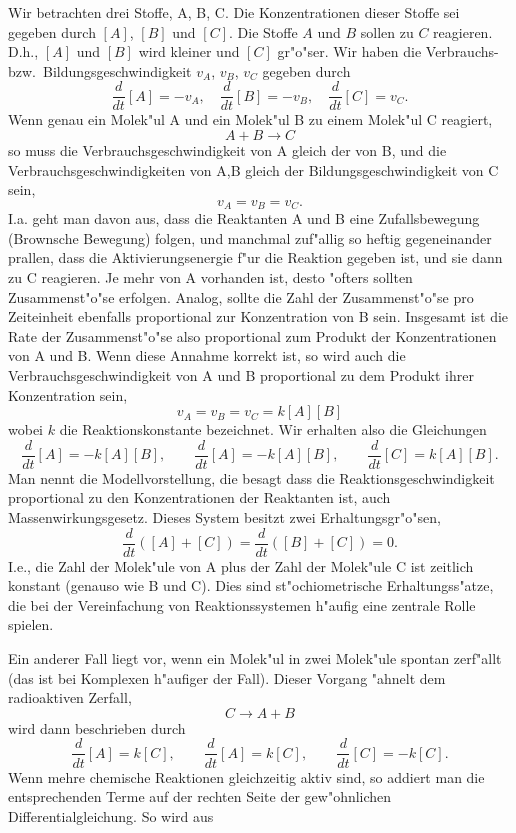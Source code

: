 Wir betrachten drei Stoffe, A, B, C. Die Konzentrationen dieser Stoffe sei gegeben durch $[A]$,
$[B]$ und $[C]$. Die Stoffe $A$ und $B$ sollen zu $C$ reagieren. D.h., $[A]$ und $[B]$ wird kleiner
und $[C]$ gr"o"ser. Wir haben die Verbrauchs- bzw.\ Bildungsgeschwindigkeit $v_A$, $v_B$, $v_C$ gegeben durch
$$ 
\frac d{dt}[A] = -v_A,\quad 
\frac d{dt}[B] = -v_B,\quad 
\frac d{dt}[C] = v_C.$$
Wenn genau ein Molek"ul A und ein Molek"ul B zu einem Molek"ul C reagiert, 
$$ A+B\rightarrow C$$
so muss die Verbrauchsgeschwindigkeit von A gleich der von B, und die Verbrauchsgeschwindigkeiten von A,B gleich der
Bildungsgeschwindigkeit von C sein,
$$ v_A=v_B=v_C.$$
I.a. geht man davon aus, dass die Reaktanten A und B eine Zufallsbewegung (Brownsche Bewegung) folgen, und
manchmal zuf"allig so heftig gegeneinander prallen, dass die Aktivierungsenergie f"ur die Reaktion 
gegeben ist, und sie dann zu C reagieren. 
Je mehr von A vorhanden ist, desto "ofters sollten Zusammenst"o"se erfolgen. Analog, sollte die Zahl
der Zusammenst"o"se pro Zeiteinheit ebenfalls proportional zur Konzentration von B sein. Insgesamt 
ist die Rate der Zusammenst"o"se also proportional zum Produkt der Konzentrationen von A und B. 
Wenn diese Annahme korrekt ist, so wird auch die Verbrauchsgeschwindigkeit 
von A und B proportional zu dem Produkt ihrer Konzentration sein,
$$ v_A=v_B = v_C = k [A][B]$$
wobei $k$ die Reaktionskonstante bezeichnet. Wir erhalten also die Gleichungen
$$ \frac d{dt}[A] = -k [A][B],\qquad \frac d{dt}[A] = -k [A][B],\qquad \frac d{dt}[C] = k [A][B].$$
Man nennt die Modellvorstellung, die besagt dass die Reaktionsgeschwindigkeit proportional
zu den Konzentrationen der Reaktanten ist, auch Massenwirkungsgesetz. 
Dieses System besitzt zwei Erhaltungsgr"o"sen,
$$ \frac d {dt} ([A]+[C])=\frac d {dt} ([B]+[C])=0.$$
I.e., die Zahl der Molek"ule von A plus der Zahl der Molek"ule C ist zeitlich konstant (genauso wie B und C). Dies sind st"ochiometrische Erhaltungss"atze, die bei der Vereinfachung von Reaktionssystemen h"aufig 
eine zentrale Rolle spielen.\par
Ein anderer Fall liegt vor, wenn ein Molek"ul in zwei Molek"ule spontan zerf"allt 
(das ist bei Komplexen h"aufiger 
der Fall). Dieser Vorgang "ahnelt dem radioaktiven Zerfall,
$$ C \rightarrow A+B$$
wird dann beschrieben durch 
$$ \frac d{dt}[A] = k [C],\qquad \frac d{dt}[A] = k [C],\qquad \frac d{dt}[C] = -k [C].$$
Wenn  mehre chemische Reaktionen gleichzeitig aktiv sind, so addiert man die entsprechenden Terme auf der rechten Seite der gew"ohnlichen Differentialgleichung. So wird aus 
